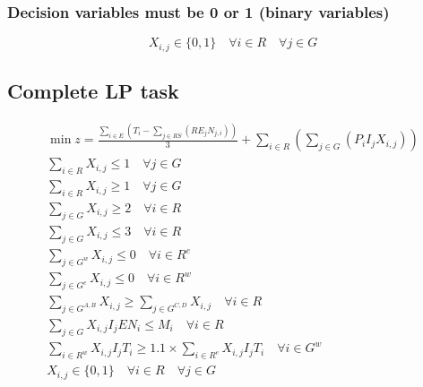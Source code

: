 \subsubsection{Decision variables must be 0 or 1 (binary variables)}
\begin{equation}
    X_{i,j} \in \{0,1\} \quad \forall i \in R \quad \forall j \in G
\end{equation}




\subsection{Complete LP task}
\begin{gather}
    \min z = \frac{\sum_{i \in E}{\left( T_i - \sum_{j \in RS}{\left( RE_j N_{j,i} \right)} \right)}}{3} + \sum_{i \in R}{\left( \sum_{ j \in G }{\left( P_i I_j X_{i,j} \right)} \right)}\nonumber\\
    \sum_{i \in R}X_{i,j} \leq 1 \quad \forall j \in G\nonumber\\
    \sum_{i \in R}X_{i,j} \geq 1 \quad \forall j \in G\nonumber\\
    \sum_{j \in G}X_{i,j} \geq 2 \quad \forall i \in R\nonumber\\
    \sum_{j \in G}X_{i,j} \leq 3 \quad \forall i \in R\nonumber\\
    \sum_{j \in G^w}X_{i,j} \leq 0 \quad \forall i \in R^e\nonumber\\
    \sum_{j \in G^e}X_{i,j} \leq 0 \quad \forall i \in R^w\nonumber\\
    \sum_{j \in G^{A,B}} X_{i,j} \geq \sum_{j \in G^{C,D}} X_{i,j} \quad \forall i \in R\nonumber\\
    \sum_{j \in G} X_{i,j} I_j EN_i \leq M_i \quad \forall i \in R\nonumber\\
    \sum_{i \in R^w} {X_{i,j} I_j T_i} \geq 1.1 \times \sum_{i \in R^e} {X_{i,j} I_j T_i} \quad \forall i \in G^w\nonumber\\
    X_{i,j} \in \{0,1\} \quad \forall i \in R \quad \forall j \in G\nonumber\\
\end{gather}
